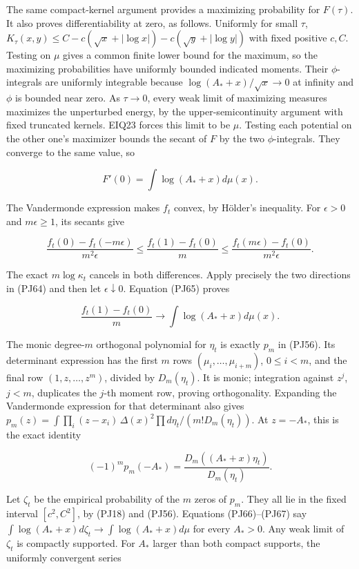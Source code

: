 \documentclass[10pt]{article}
\begin{document}
The same compact-kernel argument provides a maximizing probability for \(F(\tau)\). It also proves differentiability at zero, as follows. Uniformly for small \(\tau\), \(K_\tau(x,y)\le C-c(\sqrt x+|\log x|)-c(\sqrt y+|\log y|)\) with fixed positive \(c,C\). Testing on \(\mu\) gives a common finite lower bound for the maximum, so the maximizing probabilities have uniformly bounded indicated moments. Their \(\phi\)-integrals are uniformly integrable because \(\log(A_*+x)/\sqrt{x}\to0\) at infinity and \(\phi\) is bounded near zero. As \(\tau\to0\), every weak limit of maximizing measures maximizes the unperturbed energy, by the upper-semicontinuity argument with fixed truncated kernels. EIQ23 forces this limit to be \(\mu\). Testing each potential on the other one's maximizer bounds the secant of \(F\) by the two \(\phi\)-integrals. They converge to the same value, so

\[
F'(0)=\int\log(A_*+x)d\mu(x).
\tag{PJ65}
\]

The Vandermonde expression makes \(f_t\) convex, by Hölder's inequality. For \(\epsilon>0\) and \(m\epsilon\ge1\), its secants give

\[
\frac{f_t(0)-f_t(-m\epsilon)}{m^2\epsilon}
\le\frac{f_t(1)-f_t(0)}m
\le\frac{f_t(m\epsilon)-f_t(0)}{m^2\epsilon}.
\]

The exact \(m\log\kappa_t\) cancels in both differences. Apply precisely the two directions in (PJ64) and then let \(\epsilon\downarrow0\). Equation (PJ65) proves

\[
\frac{f_t(1)-f_t(0)}m\longrightarrow\int\log(A_*+x)d\mu(x).
\tag{PJ66}
\]

The monic degree-\(m\) orthogonal polynomial for \(\eta_t\) is exactly \(p_m\) in (PJ56). Its determinant expression has the first \(m\) rows \((\mu_i,\ldots,\mu_{i+m})\), \(0\le i<m\), and the final row \((1,z,\ldots,z^m)\), divided by \(D_m(\eta_t)\). It is monic; integration against \(z^j\), \(j<m\), duplicates the \(j\)-th moment row, proving orthogonality. Expanding the Vandermonde expression for that determinant also gives \(p_m(z)=\int\prod_i(z-x_i)\,\Delta(x)^2\prod d\eta_t/(m!D_m(\eta_t))\). At \(z=-A_*\), this is the exact identity

\[
(-1)^mp_m(-A_*)=\frac{D_m((A_*+x)\eta_t)}{D_m(\eta_t)}.
\tag{PJ67}
\]

Let \(\zeta_t\) be the empirical probability of the \(m\) zeros of \(p_m\). They all lie in the fixed interval \([c^2,C^2]\), by (PJ18) and (PJ56). Equations (PJ66)--(PJ67) say \(\int\log(A_*+x)d\zeta_t\to\int\log(A_*+x)d\mu\) for every \(A_*>0\). Any weak limit of \(\zeta_t\) is compactly supported. For \(A_*\) larger than both compact supports, the uniformly convergent series
\end{document}
